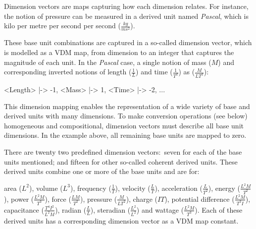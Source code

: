 \documentclass[runningheads,a4paper]{llncs}
\begin{document}
Dimension vectors are maps capturing how each dimension relates. For instance, the notion of pressure can be measured in a derived unit named \textit{Pascal}, which is kilo per metre per second per second (\(\frac{kg}{ms^2}\)). 

These base unit combinations are captured in a so-called dimension vector, which is modelled as a VDM map, from dimension to an integer that captures the magnitude of each unit. In the \textit{Pascal} case, a single notion of mass (\(M\)) and corresponding inverted notions of length (\(\frac{1}{L}\)) and time (\(\frac{1}{T^2}\)) as (\(\frac{M}{LT^2}\)): 
%
\begin{vdmsl}[frame=none,basicstyle=\ttfamily\scriptsize]
    { <Length> |-> -1, <Mass> |-> 1, <Time> |-> -2, ... }
\end{vdmsl}   
%
\noindent This dimension mapping enables the representation of a wide variety of base and derived units with many dimensions. To make conversion operations (see below) homogeneous and compositional, dimension vectors must describe all base unit dimensions. In the example above, all remaining base units are mapped to zero.

There are twenty two predefined dimension vectors:~seven for each of the base units mentioned; and fifteen for other so-called coherent derived units. These derived units combine one or more of the base units and are for:
%

area (\(L^2\)), volume (\(L^3\)), frequency (\(\frac{1}{T}\)), velocity (\(\frac{L}{T}\)), acceleration (\(\frac{L}{T^2}\)), energy (\(\frac{L^2M}{T^2}\)), power (\(\frac{L^2M}{T^3}\)), force (\(\frac{LM}{T^2}\)), pressure (\(\frac{M}{LT^2}\)), charge (\(IT\)), potential difference (\(\frac{L^2M}{T^3I}\)), capacitance (\(\frac{T^4I^2}{L^2M}\)), radian (\(\frac{L}{L}\)), steradian (\(\frac{L^2}{L^2}\)) and wattage (\(\frac{L^2M}{T^3}\)). Each of these derived units has a corresponding dimension vector as a VDM map constant. 
\end{document}
